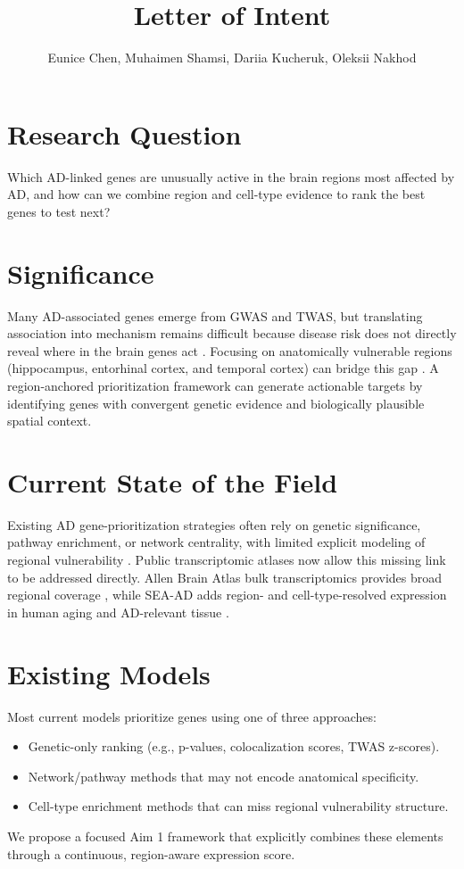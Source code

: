 \documentclass{article}
\title{Letter of Intent}
\author{Eunice Chen, Muhaimen Shamsi, Dariia Kucheruk, Oleksii Nakhod}
\begin{document}
\maketitle

\section{Research Question}
Which AD-linked genes are unusually active in the brain regions most affected by AD,
and how can we combine region and cell-type evidence to rank the best genes to test next?

\section{Significance}
Many AD-associated genes emerge from GWAS and TWAS, but translating association into mechanism remains difficult
because disease risk does not directly reveal where in the brain genes act \cite{lambert2013, disgenet2023}.
Focusing on anatomically vulnerable regions (hippocampus, entorhinal cortex, and temporal cortex) can bridge this gap \cite{adRegion2019, adRegion2022}. 
A region-anchored prioritization framework can generate actionable targets by identifying genes with convergent genetic evidence and biologically plausible spatial context.

\section{Current State of the Field}
Existing AD gene-prioritization strategies often rely on genetic significance, pathway enrichment, or network centrality, with limited explicit modeling of regional vulnerability \cite{adNetwork2026}. Public transcriptomic atlases now allow this missing link to be addressed directly. Allen Brain Atlas bulk transcriptomics provides broad regional coverage \cite{allenAtlas2012}, while SEA-AD adds region- and cell-type-resolved expression in human aging and AD-relevant tissue \cite{seaad2024, seaadPreprint2025}.

\section{Existing Models}
Most current models prioritize genes using one of three approaches:
\begin{itemize}
\item Genetic-only ranking (e.g., p-values, colocalization scores, TWAS z-scores).
\item Network/pathway methods that may not encode anatomical specificity.
\item Cell-type enrichment methods that can miss regional vulnerability structure.
\end{itemize}
We propose a focused Aim 1 framework that explicitly combines these elements through a continuous, region-aware expression score.
\end{document}
